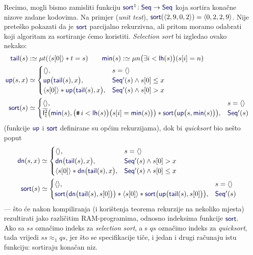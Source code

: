 \begin{primjer}[{name=[sortiranje kao jedna funkcija s raznim implementacijama]}]
    Recimo, mogli bismo zamisliti funkciju $\f{sort}^1\!:\f{Seq}\to\f{Seq}$ koja sortira konačne nizove zadane kodovima. Na primjer (\emph{unit test}), $\f{sort}(\kr{2,9,0,2})=\kr{0,2,2,9}$. Nije preteško pokazati da je $\f{sort}$ parcijalno rekurzivna, ali pritom moramo odabrati koji algoritam za sortiranje ćemo koristiti. \emph{Selection sort} bi izgledao ovako nekako:
\begin{align}
    \f{tail}(s)&:\simeq\mu t(\kr{s[0]}*t=s)\qquad
	\f{min}(s):\simeq\mu n\bigl(\exists i<\f{lh}(s)\bigr)(s[i]=n)\\
    \f{up}(s,x)&\simeq\begin{cases}
        \kr{},&s=\kr{}\\
        \f{up}\bigl(\f{tail}(s),x\bigr),&\f{Seq'}(s)\land s[0]\le x\\
        \kr{s[0]}*\f{up}\bigl(\f{tail}(s),x\bigr),&\f{Seq'}(s)\land s[0]>x
    \end{cases}\\
    \f{sort}(s)&\simeq\begin{cases}
        \kr{},&s=\kr{}\\
	    \overline{\f I_1^2}\bigl(\f{min}(s),\bigl(\num i<\f{lh}(s)\bigr)\bigl(s[i]=\f{min}(s)\bigr)\bigr)*\f{sort}\bigl(\f{up}\bigl(s,\f{min}(s)\bigr)\bigr),&\f{Seq}'(s)
    \end{cases}
\end{align}
(funkcije $\f{up}$ i $\f{sort}$ definirane su općim rekurzijama), dok bi \emph{quicksort} bio nešto poput
\begin{align}
    \f{dn}(s,x)&\simeq\begin{cases}
        \kr{},&s=\kr{}\\
        \f{dn}\bigl(\f{tail}(s),x\bigr),&\f{Seq'}(s)\land s[0]>x\\
        \kr{s[0]}*\f{dn}\bigl(\f{tail}(s),x\bigr),&\f{Seq'}(s)\land s[0]\le x
    \end{cases}\\
    \f{sort}(s)&\simeq\begin{cases}
        \kr{},&s=\kr{}\\
        \f{sort}\bigl(\f{dn}\bigl(\f{tail}(s),s[0]\bigr)\bigr)*\kr{s[0]}*\f{sort}\bigl(\f{up}\bigl(\f{tail}(s),s[0]\bigr)\bigr),&\f{Seq}'(s)
    \end{cases}
\end{align}
--- što će nakon kompiliranja (i korištenja teorema rekurzije na nekoliko mjesta) rezultirati jako različitim RAM-programima, odnosno indeksima funkcije $\f{sort}$. Ako sa $ss$ označimo indeks za \emph{selection sort}, a s $qs$ označimo indeks za \emph{quicksort}, tada vrijedi $ss\approx_1\!qs$, jer što se specifikacije tiče, i jedan i drugi računaju istu funkciju: sortiraju konačan niz.


\end{primjer}
